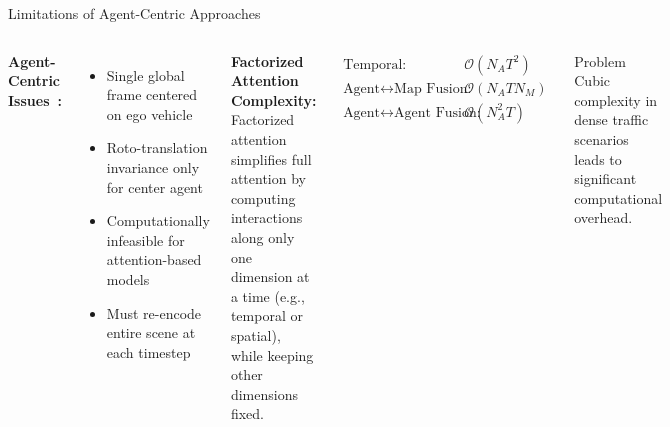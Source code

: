 \documentclass[10pt,aspectratio=169]{beamer}
\begin{document}
\begin{frame}{Limitations of Agent-Centric Approaches}
\begin{columns}[T]
\textbf{Agent-Centric Issues~\cite{qcnetZhou2023}:}
\begin{itemize}
    \item Single global frame centered on ego vehicle
    \item Roto-translation invariance only for center agent
    \item Computationally infeasible for attention-based models
    \item Must re-encode entire scene at each timestep
\end{itemize}

\textbf{Factorized Attention Complexity:}
Factorized attention simplifies full attention by computing interactions along only one dimension at a time (e.g., temporal or spatial), while keeping other dimensions fixed.

\begin{align}
\text{Temporal:} &\quad \mathcal{O}(N_{A}T^{2}) \\
\text{Agent}\leftrightarrow\text{Map Fusion:} &\quad \mathcal{O}(N_{A}T N_{M}) \\
\text{Agent}\leftrightarrow\text{Agent Fusion:} &\quad \mathcal{O}(N_{A}^{2}T)
\end{align}

\begin{alertblock}{Problem}
Cubic complexity in dense traffic scenarios leads to significant computational overhead.
\end{alertblock}
\end{columns}
\end{frame}
\end{document}

